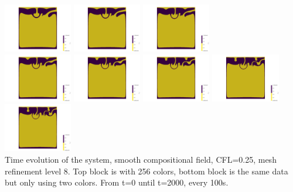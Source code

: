 \begin{itemize}
\begin{center}
\includegraphics[width=3cm]{images/benchmark_vaks97/aspect/lvl7/composition_threshold0012}
\includegraphics[width=3cm]{images/benchmark_vaks97/aspect/lvl7/composition_threshold0013}
\includegraphics[width=3cm]{images/benchmark_vaks97/aspect/lvl7/composition_threshold0014}\\
\includegraphics[width=3cm]{images/benchmark_vaks97/aspect/lvl7/composition_threshold0015}
\includegraphics[width=3cm]{images/benchmark_vaks97/aspect/lvl7/composition_threshold0016}
\includegraphics[width=3cm]{images/benchmark_vaks97/aspect/lvl7/composition_threshold0017}
\includegraphics[width=3cm]{images/benchmark_vaks97/aspect/lvl7/composition_threshold0018}
\includegraphics[width=3cm]{images/benchmark_vaks97/aspect/lvl7/composition_threshold0019}\\
{\captionfont Time evolution of the system, smooth compositional field, CFL=0.25, 
mesh refinement level 8. Top block is with 256 colors, bottom block is the same data 
but only using two colors. From t=0 until t=2000, every 100s.}
\end{center}


\end{itemize}
